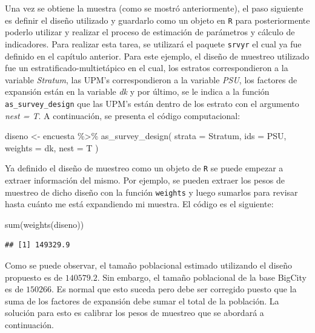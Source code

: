 \documentclass[
  12pt,
]{book}
\newenvironment{Shaded}{\begin{snugshade}}{\end{snugshade}}
\newcommand{\AttributeTok}[1]{\textcolor[rgb]{0.77,0.63,0.00}{#1}}
\newcommand{\FunctionTok}[1]{\textcolor[rgb]{0.00,0.00,0.00}{#1}}
\newcommand{\NormalTok}[1]{#1}
\newcommand{\OtherTok}[1]{\textcolor[rgb]{0.56,0.35,0.01}{#1}}
\newcommand{\SpecialCharTok}[1]{\textcolor[rgb]{0.00,0.00,0.00}{#1}}
\begin{document}
Una vez se obtiene la muestra (como se mostró anteriormente), el paso siguiente es definir el diseño utilizado y guardarlo como un objeto en \texttt{R} para posteriormente poderlo utilizar y realizar el proceso de estimación de parámetros y cálculo de indicadores. Para realizar esta tarea, se utilizará el paquete \texttt{srvyr} el cual ya fue definido en el capítulo anterior. Para este ejemplo, el diseño de muestreo utilizado fue un estratificado-multietápico en el cual, los estratos correspondieron a la variable \emph{Stratum}, las UPM's correspondieron a la variable \emph{PSU}, los factores de expansión están en la variable \emph{dk} y por último, se le indica a la función \texttt{as\_survey\_design} que las UPM's están dentro de los estrato con el argumento \emph{nest = T}. A continuación, se presenta el código computacional:

\begin{Shaded}
\begin{Highlighting}[]
\NormalTok{diseno }\OtherTok{\textless{}{-}}\NormalTok{ encuesta }\SpecialCharTok{\%\textgreater{}\%}
  \FunctionTok{as\_survey\_design}\NormalTok{(}
    \AttributeTok{strata =}\NormalTok{ Stratum,}
    \AttributeTok{ids =}\NormalTok{ PSU,}
    \AttributeTok{weights =}\NormalTok{ dk,}
    \AttributeTok{nest =}\NormalTok{ T}
\NormalTok{  )}
\end{Highlighting}
\end{Shaded}

Ya definido el diseño de muestreo como un objeto de \texttt{R} se puede empezar a extraer información del mismo. Por ejemplo, se pueden extraer los pesos de muestreo de dicho diseño con la función \texttt{weights} y luego sumarlos para revisar hasta cuánto me está expandiendo mi muestra. El código es el siguiente:

\begin{Shaded}
\begin{Highlighting}[]
\FunctionTok{sum}\NormalTok{(}\FunctionTok{weights}\NormalTok{(diseno))}
\end{Highlighting}
\end{Shaded}

\begin{verbatim}
## [1] 149329.9
\end{verbatim}

Como se puede observar, el tamaño poblacional estimado utilizando el diseño propuesto es de \(140579.2\). Sin embargo, el tamaño poblacional de la base BigCity es de \(150266\). Es normal que esto suceda pero debe ser corregido puesto que la suma de los factores de expansión debe sumar el total de la población. La solución para esto es calibrar los pesos de muestreo que se abordará a continuación.
\end{document}
